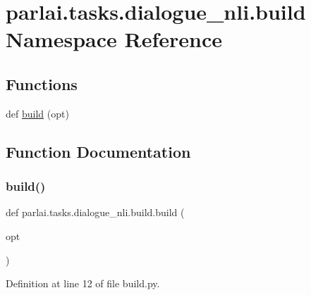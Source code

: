 \hypertarget{namespaceparlai_1_1tasks_1_1dialogue__nli_1_1build}{}\section{parlai.\+tasks.\+dialogue\+\_\+nli.\+build Namespace Reference}
\label{namespaceparlai_1_1tasks_1_1dialogue__nli_1_1build}
\subsection*{Functions}
\begin{DoxyCompactItemize}
\item 
def \hyperlink{namespaceparlai_1_1tasks_1_1dialogue__nli_1_1build_a93644603f76ca94864247f963ba47578}{build} (opt)
\end{DoxyCompactItemize}


\subsection{Function Documentation}
\mbox{\label{namespaceparlai_1_1tasks_1_1dialogue__nli_1_1build_a93644603f76ca94864247f963ba47578}} 
\subsubsection{\texorpdfstring{build()}{build()}}
{\footnotesize\ttfamily def parlai.\+tasks.\+dialogue\+\_\+nli.\+build.\+build (\begin{DoxyParamCaption}\item[{}]{opt }\end{DoxyParamCaption})}



Definition at line 12 of file build.\+py.

